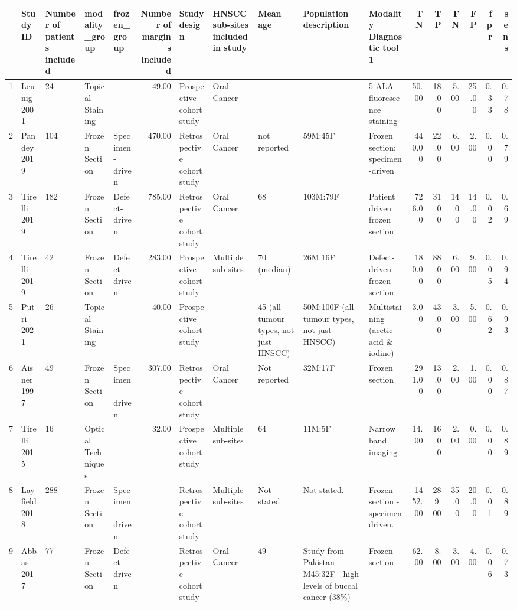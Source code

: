 \begin{table}[ht]
\centering
\begin{tabular}{rllllrlllllrrrrrr}
  \hline
 & Study ID & Number of patients included & modality\_group & frozen\_group & Number of margins included & Study design & HNSCC sub-sites included in study & Mean age & Population description & Modality Diagnostic tool 1 & TN & TP & FN & FP & fpr & sens \\ 
  \hline
1 & Leunig 2001 & 24 & Topical Staining &  & 49.00 & Prospective cohort study & Oral Cancer &  &  & 5-ALA fluorescence staining & 50.00 & 18.00 & 5.00 & 25.00 & 0.33 & 0.78 \\ 
  2 & Pandey 2019 & 104 & Frozen Section & Specimen-driven & 470.00 & Retrospective cohort study & Oral Cancer & not reported & 59M:45F & Frozen section: specimen-driven & 440.00 & 22.00 & 6.00 & 2.00 & 0.00 & 0.79 \\ 
  3 & Tirelli 2019 & 182 & Frozen Section & Defect-driven & 785.00 & Retrospective cohort study & Oral Cancer & 68 & 103M:79F & Patient driven frozen section & 726.00 & 31.00 & 14.00 & 14.00 & 0.02 & 0.69 \\ 
  4 & Tirelli 2019 & 42 & Frozen Section & Defect-driven & 283.00 & Prospective cohort study & Multiple sub-sites & 70 (median) & 26M:16F & Defect-driven frozen section & 180.00 & 88.00 & 6.00 & 9.00 & 0.05 & 0.94 \\ 
  5 & Putri 2021 & 26 & Topical Staining &  & 40.00 & Prospective cohort study &  & 45 (all tumour types, not just HNSCC) & 50M:100F (all tumour types, not just HNSCC) & Multistaining (acetic acid \& iodine) & 3.00 & 43.00 & 3.00 & 5.00 & 0.62 & 0.93 \\ 
  6 & Aisner 1997 & 49 & Frozen Section & Specimen-driven & 307.00 & Retrospective cohort study & Oral Cancer & Not reported & 32M:17F & Frozen section & 291.00 & 13.00 & 2.00 & 1.00 & 0.00 & 0.87 \\ 
  7 & Tirelli 2015 & 16 & Optical Techniques &  & 32.00 & Prospective cohort study & Multiple sub-sites & 64 & 11M:5F & Narrow band imaging & 14.00 & 16.00 & 2.00 & 0.00 & 0.00 & 0.89 \\ 
  8 & Layfield 2018 & 288 & Frozen Section & Specimen-driven &  & Retrospective cohort study & Multiple sub-sites & Not stated & Not stated. & Frozen section -specimen driven. & 1452.00 & 289.00 & 35.00 & 20.00 & 0.01 & 0.89 \\ 
  9 & Abbas 2017 & 77 & Frozen Section & Defect-driven &  & Retrospective cohort study & Oral Cancer & 49 & Study from Pakistan - M45:32F - high levels of buccal cancer (38\%) & Frozen section & 62.00 & 8.00 & 3.00 & 4.00 & 0.06 & 0.73 \\ 

\end{tabular}
\end{table}
